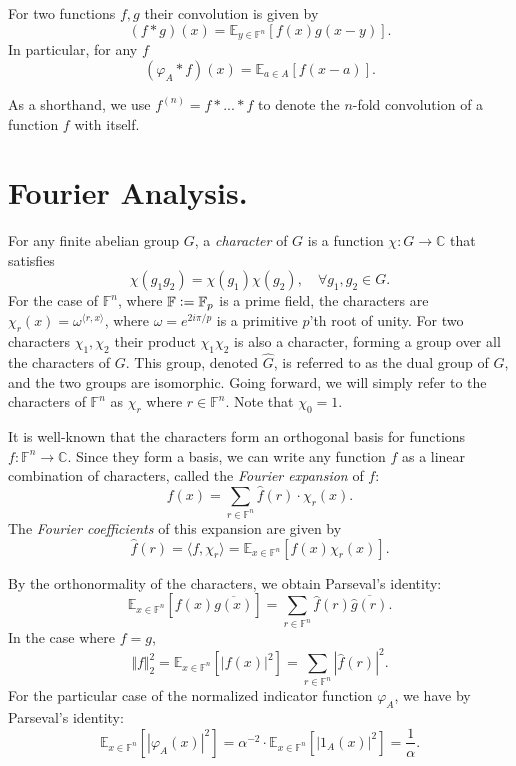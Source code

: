 \documentclass[12pt]{caltech_thesis}
\newcommand{\defeq}{\vcentcolon=}
\def\F{\mathbb{F}}
\def\E{\mathbb{E}}
\def\C{\mathbb{C}}
\renewcommand{\phi}{\varphi}
\begin{document}
For two functions $f,g$ their convolution is given by
\begin{equation*}
    (f \ast g)(x) = \E_{y \in \F^n}[f(x)g(x-y)].
\end{equation*}
In particular, for any $f$
\begin{equation*}
    (\phi_A\ast f)(x) = \E_{a \in A}[f(x-a)]. 
\end{equation*}

As a shorthand, we use $f^{(n)} = f \ast ... \ast f$ to denote the $n$-fold convolution of a function $f$ with itself.

\section{Fourier Analysis.}
For any finite abelian group $G$, a \textit{character} of $G$ is a function $\chi:G \rightarrow \mathbb{C}$ that satisfies
\begin{equation*}
    \chi(g_1g_2) = \chi(g_1)\chi(g_2), \quad \forall g_1, g_2 \in G. 
\end{equation*}
For the case of $\F^n$, where $\F \defeq \F_p$ is a prime field, the characters are $\chi_r(x) = \omega^{\langle r, x\rangle}$,
where $\omega = e^{2i\pi/p}$ is a primitive $p$'th root of unity. For two characters $\chi_1,\chi_2$ their product  $\chi_1\chi_2$ is also a character, forming a group over all the characters of $G$. This group, denoted $\widehat{G}$, is referred to as the dual group of $G$, and the two groups are isomorphic. Going forward, we will simply refer to the characters of $\F^n$ as $\chi_r$ where $r \in \F^n$. Note that $\chi_0 = 1$.

It is well-known that the characters form an orthogonal basis for functions $f: \F^n \rightarrow \C$. Since they form a basis, we can write any function $f$ as a linear combination of characters, called the \textit{Fourier expansion} of $f$:
\begin{equation*}
    f(x) = \sum_{r \in \F^n}\widehat{f}(r)\cdot \chi_r(x).
\end{equation*}
The \textit{Fourier coefficients} of this expansion are given by
\begin{equation*}
    \widehat{f}(r) = \langle f, \chi_r \rangle = \E_{x\in\F^n}[f(x)\chi_r(x)].
\end{equation*}

By the orthonormality of the characters, we obtain Parseval's identity:
\begin{equation}
\label{eq:parseval}
    \mathbb{E}_{x \in \F^n}\left[f(x)\overline{g(x)}\right] = \sum_{r \in \F^n}\widehat{f}(r)\overline{\widehat{g}(r)}.
\end{equation}
In the case where $f = g$,
\begin{equation*}
    \Vert f \Vert_2^2 = \mathbb{E}_{x \in \F^n}\left[|f(x)|^2\right] = \sum_{r \in \F^n}|\widehat{f}(r)|^2.
\end{equation*}
For the particular case of the normalized indicator function $\phi_A$, we have by Parseval's identity:
\begin{equation*}
    \mathbb{E}_{x \in \F^n}\left[|\varphi_A(x)|^2\right] = \alpha^{-2}\cdot\mathbb{E}_{x \in \F^n}\left[|1_A(x)|^2\right] = \frac{1}{\alpha}.
\end{equation*}
\end{document}
